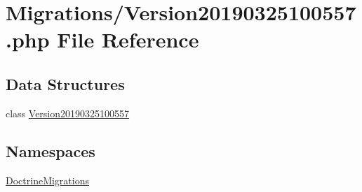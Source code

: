 \hypertarget{_version20190325100557_8php}{}\section{Migrations/\+Version20190325100557.php File Reference}
\label{_version20190325100557_8php}
\subsection*{Data Structures}
\begin{DoxyCompactItemize}
\item 
class \mbox{\hyperlink{class_doctrine_migrations_1_1_version20190325100557}{Version20190325100557}}
\end{DoxyCompactItemize}
\subsection*{Namespaces}
\begin{DoxyCompactItemize}
\item 
 \mbox{\hyperlink{namespace_doctrine_migrations}{Doctrine\+Migrations}}
\end{DoxyCompactItemize}
